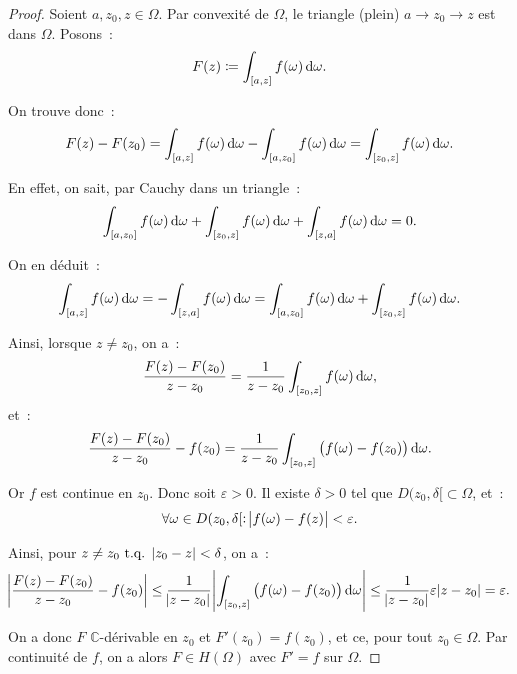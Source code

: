 \documentclass{report}
\theoremstyle{definition}
\theoremstyle{remark}
\numberwithin{equation}{section}
\newcommand{\C}{\mathbb C}
\newcommand{\tq}{\text{ t.q. }}
\begin{document}
			\begin{proof} Soient $a, z_0, z \in \Omega$. Par convexité de $\Omega$, le triangle (plein) $a \to z_0 \to z$ est dans $\Omega$. Posons~:
			\begin{equation}
				F(z) \coloneqq \int_{[a, z]}f(\omega)\dif \omega.
			\end{equation}

			On trouve donc~:
			\begin{equation}
				F(z) - F(z_0) = \int_{[a, z]}f(\omega)\dif \omega - \int_{[a, z_0]}f(\omega)\dif \omega = \int_{[z_0, z]}f(\omega)\dif \omega.
			\end{equation}

			En effet, on sait, par Cauchy dans un triangle~:
			\begin{equation}
				\int_{[a, z_0]} f(\omega)\dif \omega + \int_{[z_0, z]} f(\omega)\dif \omega + \int_{[z, a]} f(\omega)\dif \omega = 0.
			\end{equation}

			On en déduit~:
			\begin{equation}
				\int_{[a, z]} f(\omega)\dif \omega = - \int_{[z, a]} f(\omega)\dif \omega = \int_{[a, z_0]} f(\omega)\dif \omega + \int_{[z_0, z]} f(\omega)\dif \omega.
			\end{equation}

			Ainsi, lorsque $z \neq z_0$, on a~:
			\begin{equation}
				\frac {F(z)-F(z_0)}{z-z_0} = \frac 1{z-z_0}\int_{[z_0, z]}f(\omega)\dif \omega,
			\end{equation}
			et~:
			\begin{equation}
				\frac {F(z)-F(z_0)}{z-z_0} - f(z_0) = \frac 1{z-z_0}\int_{[z_0, z]}\left(f(\omega) - f(z_0)\right)\dif \omega.
			\end{equation}

			Or $f$ est continue en $z_0$. Donc soit $\varepsilon > 0$. Il existe $\delta > 0$ tel que $D(z_0, \delta[ \subset \Omega$, et~:
			\begin{equation}
				\forall \omega \in D(z_0, \delta[ : \abs {f(\omega) - f(z)} < \varepsilon.
			\end{equation}

			Ainsi, pour $z \neq z_0 \tq \abs {z_0-z} < \delta$, on a~:
			\begin{equation}
				\abs {\frac {F(z)-F(z_0)}{z-z_0} - f(z_0)} \leq \frac 1{\abs {z-z_0}}\abs {\int_{[z_0, z]}\left(f(\omega) - f(z_0)\right)\dif \omega}
					\leq \frac 1{\abs {z-z_0}}\varepsilon\abs {z-z_0} = \varepsilon.
			\end{equation}

			On a donc $F$ $\C$-dérivable en $z_0$ et $F'(z_0) = f(z_0)$, et ce, pour tout $z_0 \in \Omega$. Par continuité de $f$, on a alors $F \in H(\Omega)$
			avec $F' = f$ sur $\Omega$.
			\end{proof}
\end{document}
